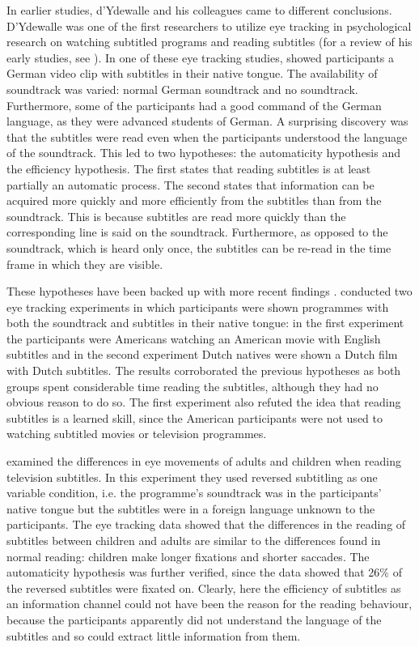 \documentclass[output=paper]{langsci/langscibook}
\begin{document}
In earlier studies, d'Ydewalle and his colleagues came to different conclusions. D'Ydewalle was one of the first researchers to utilize eye tracking in psychological research on watching subtitled programs and reading subtitles (for a review of his early studies, see \citealt{dydewalle1992}). In one of these eye tracking studies, \citet{dydewalle1987} showed participants a German video clip with subtitles in their native tongue. The availability of soundtrack was varied: normal German soundtrack and no soundtrack. Furthermore, some of the participants had a good command of the German language, as they were advanced students of German. A surprising discovery was that the subtitles were read even when the participants understood the language of the soundtrack. This led to two hypotheses: the automaticity hypothesis and the efficiency hypothesis. The first states that reading subtitles is at least partially an automatic process. The second states that information can be acquired more quickly and more efficiently from the subtitles than from the soundtrack. This is because subtitles are read more quickly than the corresponding line is said on the soundtrack. Furthermore, as opposed to the soundtrack, which is heard only once, the subtitles can be re-read in the time frame in which they are visible. 

These hypotheses have been backed up with more recent findings \citep{dydewalle1991, Bruycker2007, Perego2010, Perego2015}. \citet{dydewalle1991} conducted two eye tracking experiments in which participants were shown programmes with both the soundtrack and subtitles in their native tongue: in the first experiment the participants were Americans watching an American movie with English subtitles and in the second experiment Dutch natives were shown a Dutch film with Dutch subtitles. The results corroborated the previous hypotheses as both groups spent considerable time reading the subtitles, although they had no obvious reason to do so. The first experiment also refuted the idea that reading subtitles is a learned skill, since the American participants were not used to watching subtitled movies or television programmes.

\citet{Bruycker2007} examined the differences in eye movements of adults and children when reading television subtitles. In this experiment they used reversed subtitling as one variable condition, i.e. the programme's soundtrack was in the participants' native tongue but the subtitles were in a foreign language unknown to the participants. The eye tracking data showed that the differences in the reading of subtitles between children and adults are similar to the differences found in normal reading: children make longer fixations and shorter saccades. The automaticity hypothesis was further verified, since the data showed that 26\% of the reversed subtitles were fixated on. Clearly, here the efficiency of subtitles as an information channel could not have been the reason for the reading behaviour, because the participants apparently did not understand the language of the subtitles and so could extract little information from them. 
\end{document}
